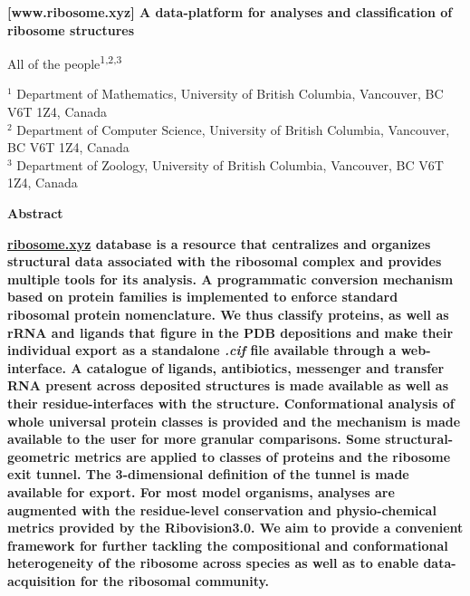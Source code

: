 \documentclass[11pt]{article}
\begin{document}
\begin{center}
\textbf{\large [www.ribosome.xyz] A data-platform for analyses and classification of ribosome structures}

\vspace{7mm}



All of the people\textsuperscript{1,2,3}
\\

\end{center}
\vspace{5mm}
{\small
$^{1}$ Department of Mathematics, University of British Columbia, Vancouver, BC V6T 1Z4, Canada\\
$^{2}$ Department of Computer Science, University of British Columbia, Vancouver, BC V6T 1Z4, Canada\\
$^{3}$ Department of Zoology, University of British Columbia, Vancouver, BC V6T 1Z4, Canada
}





\vspace{5mm}


\begin{center}
\textbf{Abstract}\\ %
\end{center}
    \textbf{ \href{www.ribosome.xyz}{ribosome.xyz} database is a resource that centralizes and organizes structural data associated with the ribosomal complex and provides multiple tools for its analysis.
    A programmatic conversion mechanism based on protein families is implemented to enforce standard ribosomal protein nomenclature.  We thus classify proteins, as well as rRNA and ligands that figure in the PDB depositions and make their individual export as a standalone \textit{.cif} file available through a web-interface. A catalogue of ligands, antibiotics, messenger and transfer RNA present across deposited structures is made available as well as their residue-interfaces with the structure. Conformational analysis of whole universal protein classes is provided and the mechanism is made available to the user for more granular comparisons. Some structural-geometric metrics are applied to classes of proteins and the ribosome exit tunnel. The 3-dimensional definition of the tunnel is made available for export. For most model organisms, analyses are augmented with the residue-level conservation and physio-chemical metrics provided by the Ribovision3.0. We aim to provide a convenient framework for further tackling the compositional and conformational heterogeneity of the ribosome across species as well as to enable data-acquisition for the ribosomal community.}
\end{document}
